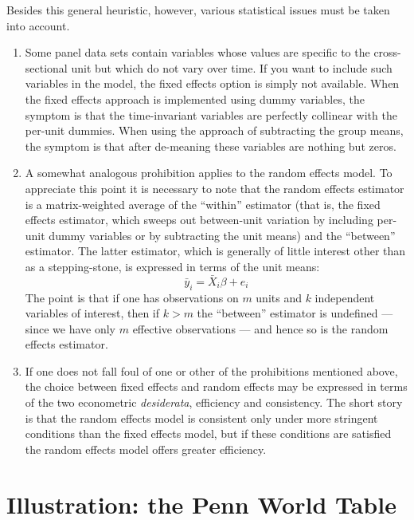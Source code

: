 Besides this general heuristic, however, various statistical
issues must be taken into account.

\begin{enumerate}

\item Some panel data sets contain variables whose values are specific
  to the cross-sectional unit but which do not vary over time.  If you
  want to include such variables in the model, the fixed effects
  option is simply not available.  When the fixed effects approach is
  implemented using dummy variables, the symptom is that the
  time-invariant variables are perfectly collinear with the per-unit
  dummies.  When using the approach of subtracting the group means,
  the symptom is that after de-meaning these variables are nothing but
  zeros.
\item A somewhat analogous prohibition applies to the random effects
  model.  To appreciate this point it is necessary to note that the
  random effects estimator is a matrix-weighted average of the
  ``within'' estimator (that is, the fixed effects estimator, which
  sweeps out between-unit variation by including per-unit dummy
  variables or by subtracting the unit means) and the ``between''
  estimator.  The latter estimator, which is generally of little
  interest other than as a stepping-stone, is expressed in terms of
  the unit means:
\[
\bar{y}_i = \bar{X}_i \beta + e_i
\]
The point is that if one has observations on $m$ units and $k$
independent variables of interest, then if $k>m$ the ``between''
estimator is undefined --- since we have only $m$ effective
observations --- and hence so is the random effects estimator.

\item If one does not fall foul of one or other of the prohibitions
  mentioned above, the choice between fixed effects and random effects
  may be expressed in terms of the two econometric
  \textit{desiderata}, efficiency and consistency.  The short story is
  that the random effects model is consistent only under more
  stringent conditions than the fixed effects model, but if these
  conditions are satisfied the random effects model offers greater
  efficiency.

\end{enumerate}


\section{Illustration: the Penn World Table}
\label{PWT}

